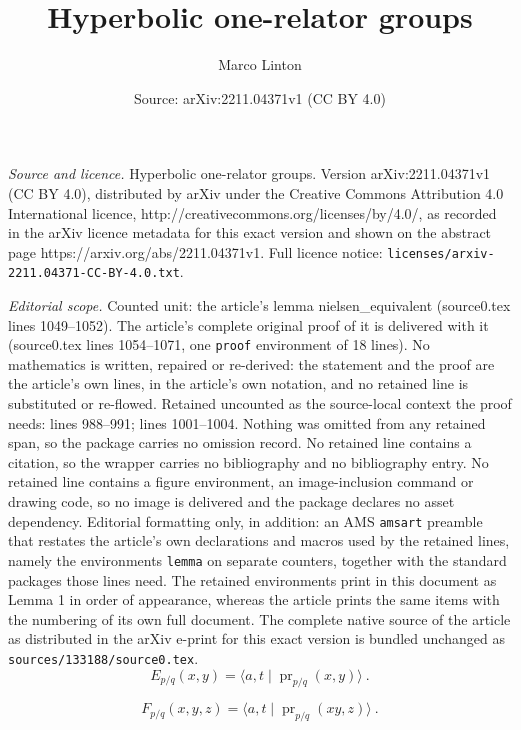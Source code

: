 \documentclass[10pt,a4paper]{amsart}
\title{Hyperbolic one-relator groups}
\author{Marco Linton}
\date{Source: arXiv:2211.04371v1 (CC BY 4.0)}
\DeclareMathOperator{\pr}{pr}
\begin{document}
\maketitle

\noindent\emph{Source and licence.} Hyperbolic one-relator groups. Version arXiv:2211.04371v1 (CC BY 4.0), distributed by arXiv under the Creative Commons Attribution 4.0 International licence, http://creativecommons.org/licenses/by/4.0/, as recorded in the arXiv licence metadata for this exact version and shown on the abstract page https://arxiv.org/abs/2211.04371v1. Full licence notice: \texttt{licenses/arxiv-2211.04371-CC-BY-4.0.txt}.\par\smallskip

\noindent\textit{Editorial scope.} Counted unit: the article's lemma nielsen\_equivalent (source0.tex lines 1049--1052). The article's complete original proof of it is delivered with it (source0.tex lines 1054--1071, one \texttt{proof} environment of 18 lines). No mathematics is written, repaired or re-derived: the statement and the proof are the article's own lines, in the article's own notation, and no retained line is substituted or re-flowed.  Retained uncounted as the source-local context the proof needs: lines 988--991; lines 1001--1004.  Nothing was omitted from any retained span, so the package carries no omission record.  No retained line contains a citation, so the wrapper carries no bibliography and no bibliography entry.  No retained line contains a figure environment, an image-inclusion command or drawing code, so no image is delivered and the package declares no asset dependency.  Editorial formatting only, in addition: an AMS \texttt{amsart} preamble that restates the article's own declarations and macros used by the retained lines, namely the environments \texttt{lemma} on separate counters, together with the standard packages those lines need.  The retained environments print in this document as Lemma 1 in order of appearance, whereas the article prints the same items with the numbering of its own full document.  The complete native source of the article as distributed in the arXiv e-print for this exact version is bundled unchanged as \texttt{sources/133188/source0.tex}.
\begin{equation}
\label{pe_1}
E_{p/q}(x, y) = \langle a, t \mid \pr_{p/q}(x, y)\rangle~.
\end{equation}

\begin{equation}
\label{pe_2}
F_{p/q}(x, y, z) = \langle a, t \mid \pr_{p/q}(xy, z)\rangle~.
\end{equation}
\end{document}

